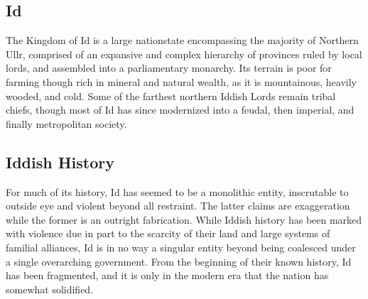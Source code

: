 \begin{multicols}{2}
	\section{Id}
			The Kingdom of Id is a large nationstate encompassing the majority of Northern Ullr, comprised of an expansive and complex hierarchy of provinces ruled by local lords, and assembled into a parliamentary monarchy. Its terrain is poor for farming though rich in mineral and natural wealth, as it is mountainous, heavily wooded, and cold. Some of the farthest northern Iddish Lords remain tribal chiefs, though most of Id has since modernized into a feudal, then imperial, and finally metropolitan society.
	\subsection{Iddish History}
			For much of its history, Id has seemed to be a monolithic entity, inscrutable to outside eye and violent beyond all restraint. The latter claims are exaggeration while the former is an outright fabrication. While Iddish history has been marked with violence due in part to the scarcity of their land and large systems of familial alliances, Id is in no way a singular entity beyond being coalesced under a single overarching government. From the beginning of their known history, Id has been fragmented, and it is only in the modern era that the nation has somewhat solidified. 

\end{multicols}
